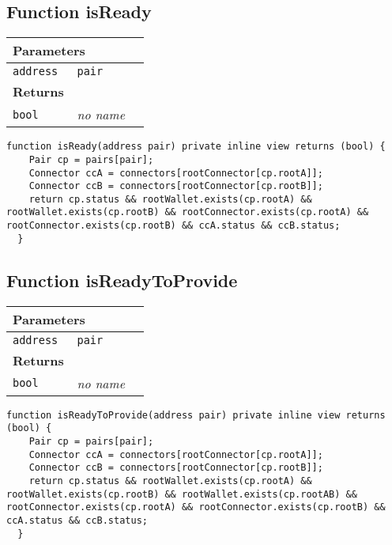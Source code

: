 \subsection{Function isReady}


\ifsoltables
\noindent\begin{tabular}{|l|l|p{5cm}|}\hline
\multicolumn{3}{|l|}{\bf Parameters}\\\hline
\tt address & \tt pair &\\\hline
\multicolumn{3}{|l|}{\bf Returns}\\\hline
\tt bool & {\em no name} &\\\hline
\end{tabular}
\fi

\vspace{2cm}

\begin{lstlisting}[firstnumber=198]
  function isReady(address pair) private inline view returns (bool) {
    Pair cp = pairs[pair];
    Connector ccA = connectors[rootConnector[cp.rootA]];
    Connector ccB = connectors[rootConnector[cp.rootB]];
    return cp.status && rootWallet.exists(cp.rootA) && rootWallet.exists(cp.rootB) && rootConnector.exists(cp.rootA) && rootConnector.exists(cp.rootB) && ccA.status && ccB.status;
  }
\end{lstlisting}

\subsection{Function isReadyToProvide}


\ifsoltables
\noindent\begin{tabular}{|l|l|p{5cm}|}\hline
\multicolumn{3}{|l|}{\bf Parameters}\\\hline
\tt address & \tt pair &\\\hline
\multicolumn{3}{|l|}{\bf Returns}\\\hline
\tt bool & {\em no name} &\\\hline
\end{tabular}
\fi

\vspace{2cm}

\begin{lstlisting}[firstnumber=206]
  function isReadyToProvide(address pair) private inline view returns (bool) {
    Pair cp = pairs[pair];
    Connector ccA = connectors[rootConnector[cp.rootA]];
    Connector ccB = connectors[rootConnector[cp.rootB]];
    return cp.status && rootWallet.exists(cp.rootA) && rootWallet.exists(cp.rootB) && rootWallet.exists(cp.rootAB) && rootConnector.exists(cp.rootA) && rootConnector.exists(cp.rootB) && ccA.status && ccB.status;
  }
\end{lstlisting}

